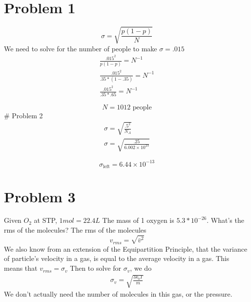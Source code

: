 \documentclass[]{article}
\begin{document}
\hypertarget{problem-1}{%
\section{Problem 1}\label{problem-1}}

\[
\sigma = \sqrt{ \frac{p(1-p)}{N} }
\] We need to solve for the number of people to make \(\sigma=.015\) \[
\begin{align}
\frac{.015^{2}}{p(1-p)} = N^{-1} \\
\frac{.015^{2}}{.35*(1-.35)}=N^{-1} \\
\frac{.015^{2}}{.35*.65} = N^{-1}
\end{align}
\]

\begin{Shaded}
\begin{Highlighting}[]
\end{Highlighting}
\end{Shaded}

\[
N = 1012 \text{ people}
\] \# Problem 2 \[
\begin{align}
\sigma=\sqrt{ \frac{.5^{2}}{N_{A}} } \\
\sigma=\sqrt{ \frac{.25}{6.002\times {10}^{23}} }
\end{align}
\]

\begin{Shaded}
\begin{Highlighting}[]
\end{Highlighting}
\end{Shaded}

\[
\sigma_{\text{left}} = 6.44\times 10^{-13}
\]

\hypertarget{problem-3}{%
\section{Problem 3}\label{problem-3}}

Given \(O_{2}\) at STP, \(1mol = 22.4L\) The mass of 1 oxygen is
\(5.3*10^{-26}\). What's the rms of the molecules? The rms of the
molecules \[
v_{rms} = \sqrt{ \bar{v}^{2} }
\] We also know from an extension of the Equipartition Principle, that
the variance of particle's velocity in a gas, is equal to the average
velocity in a gas. This means that \(v_{rms} = \sigma_{v}\) Then to
solve for \(\sigma_{v}\), we do \[
\begin{align}
\sigma_{v} = \sqrt{ \frac{{3k_{b}T}}{m} }
\end{align}
\] We don't actually need the number of molecules in this gas, or the
pressure.
\end{document}
